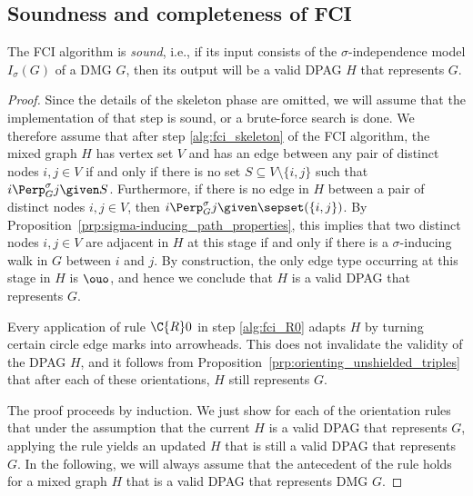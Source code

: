 \subsection{Soundness and completeness of FCI}

\begin{Thm}\label{thm:fci_sound}
  The FCI algorithm is \emph{sound}, i.e., if its input consists of the $\sigma$-independence model $I_\sigma(G)$ of a DMG $G$, then its output will be a valid DPAG $H$ that represents $G$.
\end{Thm}
\begin{proof}
  Since the details of the skeleton phase are omitted, we will assume that the implementation of that step is sound, or a brute-force search is done.
  We therefore assume that after step \ref{alg:fci_skeleton} of the FCI algorithm, the mixed graph $H$ has vertex set $V$ and has an edge between any pair of distinct nodes $i,j \in V$ if and only if there is no set $S \subseteq V \setminus \{i,j\}$ such that $i \Perp^\sigma_G j \given S$.
  Furthermore, if there is no edge in $H$ between a pair of distinct nodes $i,j \in V$, then $i \Perp^\sigma_G j \given \sepset(\{i,j\})$.
  By Proposition~\ref{prp:sigma-inducing_path_properties}, this implies that two distinct nodes $i,j \in V$ are adjacent in $H$ at this stage if and only if there is a $\sigma$-inducing walk in $G$ between $i$ and $j$.
  By construction, the only edge type occurring at this stage in $H$ is $\ouo$, and hence we conclude that $H$ is a valid DPAG that represents $G$. 

  Every application of rule $\C{R}0$ in step \ref{alg:fci_R0} adapts $H$ by turning certain circle edge marks into arrowheads.
  This does not invalidate the validity of the DPAG $H$, and it follows from Proposition~\ref{prp:orienting_unshielded_triples} that after each of these orientations, $H$ still represents $G$.

  The proof proceeds by induction.
  We just show for each of the orientation rules that under the assumption that the current $H$ is a valid DPAG that represents $G$, applying the rule yields an updated $H$ that is still a valid DPAG that represents $G$.
  In the following, we will always assume that the antecedent of the rule holds for a mixed graph $H$ that is a valid DPAG that represents DMG $G$.


\end{proof}
